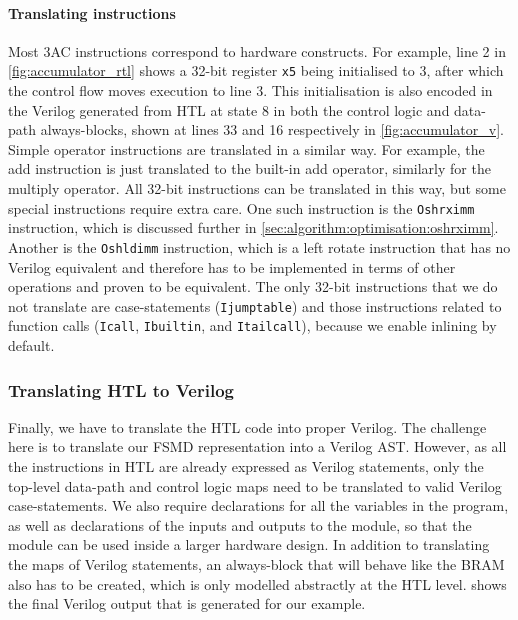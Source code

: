 \paragraph{Translating instructions}

Most 3AC instructions correspond to hardware constructs.
For example, line 2 in \cref{fig:accumulator_rtl} shows a 32-bit register
\texttt{x5} being initialised to 3, after which the control flow moves execution
to line 3. This initialisation is also encoded in the Verilog generated from HTL
at state 8 in both the control logic and data-path always-blocks, shown at lines
33 and 16 respectively in \cref{fig:accumulator_v}.  Simple operator
instructions are translated in a similar way.  For example, the add instruction
is just translated to the built-in add operator, similarly for the multiply
operator.  All 32-bit instructions can be translated in this way, but some
special instructions require extra care. One such instruction is the
\texttt{Oshrximm} instruction, which is discussed further in
\cref{sec:algorithm:optimisation:oshrximm}. Another is the
\texttt{Oshldimm} instruction, which is a left rotate instruction that has no
Verilog equivalent and therefore has to be implemented in terms of other
operations and proven to be equivalent.
The only 32-bit instructions that we do not translate are case-statements (\texttt{Ijumptable}) and those instructions related to function calls (\texttt{Icall}, \texttt{Ibuiltin}, and \texttt{Itailcall}), because we enable inlining by default.

\subsubsection{Translating HTL to Verilog}

Finally, we have to translate the HTL code into proper
Verilog. %
The challenge here is to translate our FSMD representation into a Verilog AST.
However, as all the instructions in HTL are already expressed as Verilog
statements, only the top-level data-path and control logic maps need to be
translated to valid Verilog case-statements.  We also require declarations for
all the variables in the program, as well as declarations of the inputs and
outputs to the module, so that the module can be used inside a larger hardware
design.  In addition to translating the maps of Verilog statements, an
always-block that will behave like the \gls{BRAM} also has to be created, which
is only modelled abstractly at the HTL level.   shows
the final Verilog output that is generated for our example.

